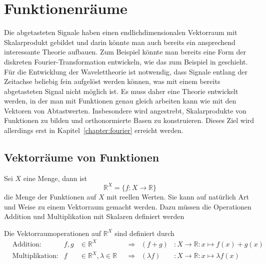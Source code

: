%
%
%
\section{Funktionenräume%
\label{section:funktionenraume}}
%
Die abgetasteten Signale haben einen endlichdimensionalen Vektorraum
mit Skalarprodukt gebildet und darin könnte man auch bereits ein
ansprechend interessante Theorie aufbauen.
Zum Beispiel könnte man bereits eine Form der diskreten
Fourier-Transformation entwickeln, wie das zum Beispiel in
\cite{buch:mathsem-klima} geschieht.
Für die Entwicklung der Wavelettheorie ist notwendig, dass Signale
entlang der Zeitachse beliebig fein aufgelöst werden können, was
mit einem bereits abgetasteten Signal nicht möglich ist.
Es muss daher eine Theorie entwickelt werden, in der man mit
Funktionen genau gleich arbeiten kann wie mit den Vektoren von
Abtastwerten.
Insbesondere wird angestrebt, Skalarprodukte von Funktionen
zu bilden und orthonormierte Basen zu konstruieren. 
Dieses Ziel wird allerdings erst in Kapitel~\ref{chapter:fourier} erreicht werden.

\subsection{Vektorräume von Funktionen}
Sei $X$ eine Menge, dann ist
\[
\mathbb R^X = \{ f\colon X\to\mathbb R\}
\]
die Menge der Funktionen auf $X$ mit reellen Werten.
Sie kann auf natürlich Art und Weise zu einem Vektorraum gemacht werden.
Dazu müssen die Operationen Addition und Multiplikation mit Skalaren
definiert werden

\begin{definition}
Die Vektorraumoperationen auf $\mathbb R^X$ sind definiert durch
\[
\begin{aligned}
&\text{Addition:}
&
f,g&\in \mathbb R^X
	&&\Rightarrow
	&(f+g)&\colon X\to\mathbb R:x\mapsto f(x)+g(x)
\\
&\text{Multiplikation:}
&
f&\in\mathbb R^X, \lambda\in\mathbb R
	&&\Rightarrow
	&(\lambda f)&\colon X\to\mathbb R:x\mapsto \lambda f(x)
\end{aligned}
\]
\end{definition}

